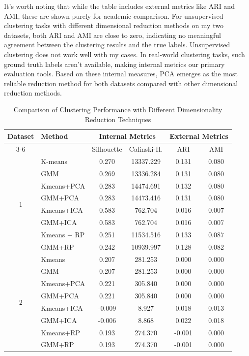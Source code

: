 \documentclass[conference]{IEEEtran}
\begin{document}
It's worth noting that while the table includes external metrics like ARI and AMI, these are shown purely for academic comparison. For unsupervised clustering tasks with different dimensional reduction methods on my two datasets, both ARI and AMI are close to zero, indicating no meaningful agreement between the clustering results and the true labels. Unsupervised clustering does not work well with my cases. 
In real-world clustering tasks, such ground truth labels aren't available, making internal metrics our primary evaluation tools. Based on these internal measures, PCA emerges as the most reliable reduction method for both datasets compared with other dimensional reduction methods.
\vspace{8pt}
\begin{table}[htbp]
    \centering
    \small 
    \caption{Comparison of Clustering Performance with Different Dimensionality Reduction Techniques}
    \label{tab:clustering-metrics}
    \setlength{\tabcolsep}{3pt}  
    \begin{tabular}{c|l|cc|cc}
    \hline
    \multirow{2}{*}{Dataset} & \multirow{2}{*}{Method} & \multicolumn{2}{c|}{Internal Metrics} & \multicolumn{2}{c}{External Metrics} \\
    \cline{3-6}
     &  & Silhouette & Calinski-H. & ARI & AMI \\
    \hline
    \multirow{8}{*}{1} & K-means & 0.270 & 13337.229 & 0.131 & 0.080 \\
     & GMM & 0.269 & 13336.284 & 0.131 & 0.080 \\
     & Kmeans+PCA & 0.283 & 14474.691 & 0.132 & 0.080 \\
     & GMM+PCA & 0.283 & 14473.416 & 0.131 & 0.080 \\
     & Kmeans+ICA & 0.583 & 762.704 & 0.016 & 0.007 \\
     & GMM+ICA & 0.583 & 762.704 & 0.016 & 0.007 \\
     & Kmeans + RP & 0.251 & 11534.516 & 0.133 & 0.087 \\
     & GMM+RP & 0.242 & 10939.997 & 0.128 & 0.082 \\
    \hline
    \multirow{8}{*}{2} & Kmeans & 0.207 & 281.253 & 0.000 & 0.000 \\
     & GMM & 0.207 & 281.253 & 0.000 & 0.000 \\
     & Kmeans+PCA & 0.221 & 305.840 & 0.000 & 0.000 \\
     & GMM+PCA & 0.221 & 305.840 & 0.000 & 0.000 \\
     & Kmeans+ICA & -0.009 & 8.927 & 0.018 & 0.013 \\
     & GMM+ICA & -0.006 & 8.868 & 0.022 & 0.018 \\
     & Kmeans+RP & 0.193 & 274.370 & -0.001 & 0.000 \\
     & GMM+RP & 0.193 & 274.370 & -0.001 & 0.000 \\
    \hline
    \end{tabular}
    \end{table}
\end{document}
